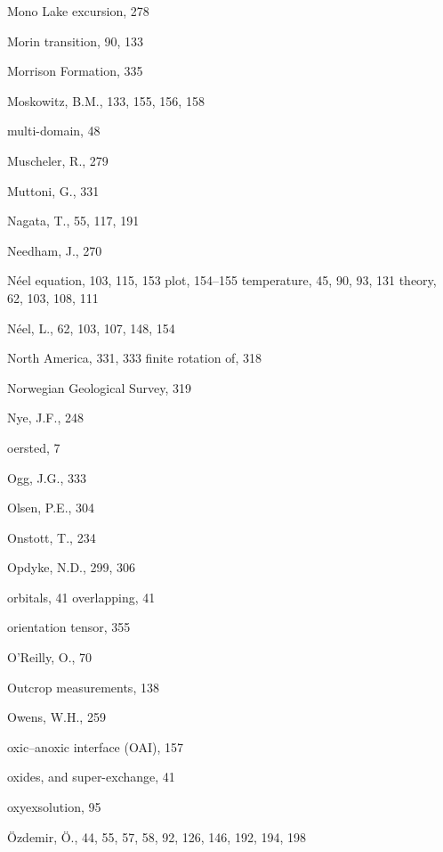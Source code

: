 \documentclass[,plain]{tauxe}
\begin{document}
\begin{theindex}
  \item Mono Lake excursion, 278
  \item Morin transition, 90, 133
  \item Morrison Formation, 335
  \item Moskowitz, B.M., 133, 155, 156, 158
  \item multi-domain, 48
  \item Muscheler, R., 279
  \item Muttoni, G., 331

  \indexspace

  \item Nagata, T., 55, 117, 191
  \item Needham, J., 270
  \item N\'eel
    \subitem equation, 103, 115, 153
    \subitem plot, 154--155
	\subitem temperature, 45, 90, 93, 131
    \subitem theory, 62, 103, 108, 111
  \item N\'eel, L., 62, 103, 107, 148, 154
      \item North America,  331, 333
    \subitem finite rotation of, 318
  \item Norwegian Geological Survey, 319
  \item Nye, J.F., 248

  \indexspace

   \item oersted, 7
  \item Ogg, J.G., 333
  \item Olsen, P.E., 304
  \item Onstott, T., 234
  \item Opdyke, N.D., 299, 306
  \item orbitals, 41
    \subitem overlapping, 41
  \item orientation tensor, 355
  \item O'Reilly, O., 70
 \item Outcrop measurements, 138
  \item Owens, W.H., 259
 \item oxic--anoxic interface (OAI), 157
  \item oxides,  and super-exchange, 41
  \item oxyexsolution, 95
\item \"Ozdemir, \"O., 44, 55, 57, 58, 92, 126, 146, 192, 194, 198
 

\end{theindex}
\end{document}
